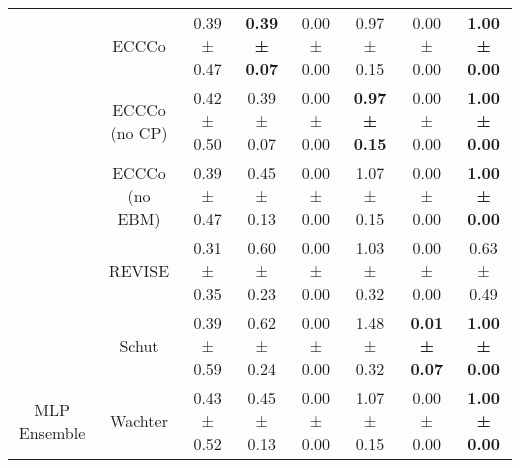 \begin{table}
{\begin{tabular}[t]{cccccccc}
 & ECCCo & 0.39 ± 0.47\hphantom{*}\hphantom{*} & \textbf{0.39 ± 0.07}\hphantom{*}\hphantom{*} & 0.00 ± 0.00\hphantom{*}\hphantom{*} & 0.97 ± 0.15\hphantom{*}\hphantom{*} & 0.00 ± 0.00\hphantom{*}\hphantom{*} & \textbf{1.00 ± 0.00}\hphantom{*}\hphantom{*}\\

 & ECCCo (no CP) & 0.42 ± 0.50\hphantom{*}\hphantom{*} & 0.39 ± 0.07\hphantom{*}\hphantom{*} & 0.00 ± 0.00\hphantom{*}\hphantom{*} & \textbf{0.97 ± 0.15}\hphantom{*}\hphantom{*} & 0.00 ± 0.00\hphantom{*}\hphantom{*} & \textbf{1.00 ± 0.00}\hphantom{*}\hphantom{*}\\

 & ECCCo (no EBM) & 0.39 ± 0.47\hphantom{*}\hphantom{*} & 0.45 ± 0.13\hphantom{*}\hphantom{*} & 0.00 ± 0.00\hphantom{*}\hphantom{*} & 1.07 ± 0.15\hphantom{*}\hphantom{*} & 0.00 ± 0.00\hphantom{*}\hphantom{*} & \textbf{1.00 ± 0.00}\hphantom{*}\hphantom{*}\\

 & REVISE & 0.31 ± 0.35\hphantom{*}\hphantom{*} & 0.60 ± 0.23\hphantom{*}\hphantom{*} & 0.00 ± 0.00\hphantom{*}\hphantom{*} & 1.03 ± 0.32\hphantom{*}\hphantom{*} & 0.00 ± 0.00\hphantom{*}\hphantom{*} & 0.63 ± 0.49\hphantom{*}\hphantom{*}\\

 & Schut & 0.39 ± 0.59\hphantom{*}\hphantom{*} & 0.62 ± 0.24\hphantom{*}\hphantom{*} & 0.00 ± 0.00\hphantom{*}\hphantom{*} & 1.48 ± 0.32\hphantom{*}\hphantom{*} & \textbf{0.01 ± 0.07}\hphantom{*}\hphantom{*} & \textbf{1.00 ± 0.00}\hphantom{*}\hphantom{*}\\

\multirow[t]{-9}{*}{\centering\arraybackslash MLP Ensemble} & Wachter & 0.43 ± 0.52\hphantom{*}\hphantom{*} & 0.45 ± 0.13\hphantom{*}\hphantom{*} & 0.00 ± 0.00\hphantom{*}\hphantom{*} & 1.07 ± 0.15\hphantom{*}\hphantom{*} & 0.00 ± 0.00\hphantom{*}\hphantom{*} & \textbf{1.00 ± 0.00}\hphantom{*}\hphantom{*}\\
\bottomrule
\end{tabular}}
\end{table}
